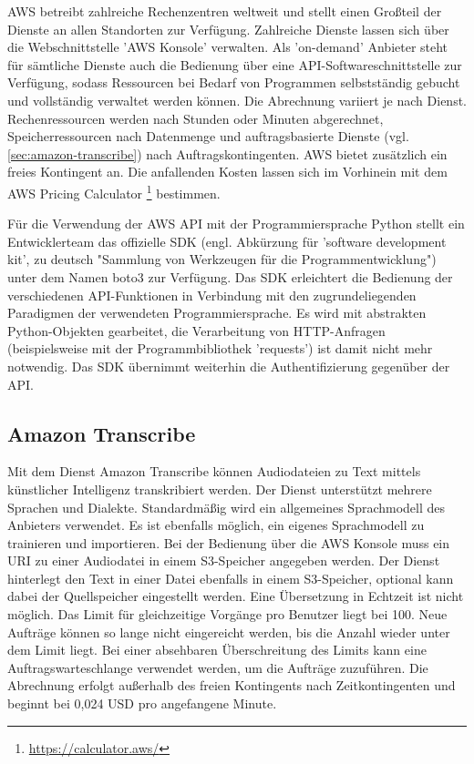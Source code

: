 AWS betreibt zahlreiche Rechenzentren weltweit und stellt einen Großteil der Dienste an allen Standorten zur Verfügung. Zahlreiche Dienste lassen sich über die Webschnittstelle 'AWS Konsole' verwalten. Als 'on-demand' Anbieter steht für sämtliche Dienste auch die Bedienung über eine API-Softwareschnittstelle zur Verfügung, sodass Ressourcen bei Bedarf von Programmen selbstständig gebucht und vollständig verwaltet werden können. Die Abrechnung variiert je nach Dienst. Rechenressourcen werden nach Stunden oder Minuten abgerechnet, Speicherressourcen nach Datenmenge und auftragsbasierte Dienste (vgl. \autoref{sec:amazon-transcribe}) nach Auftragskontingenten. AWS bietet zusätzlich ein freies Kontingent an. Die anfallenden Kosten lassen sich im Vorhinein mit dem AWS Pricing Calculator \footnote{\url{https://calculator.aws/}} bestimmen. 

Für die Verwendung der AWS API mit der Programmiersprache Python stellt ein Entwicklerteam das offizielle SDK (engl. Abkürzung für 'software development kit', zu deutsch "Sammlung von Werkzeugen für die Programmentwicklung") unter dem Namen boto3 zur Verfügung. Das SDK erleichtert die Bedienung der verschiedenen API-Funktionen in Verbindung mit den zugrundeliegenden Paradigmen der verwendeten Programmiersprache. Es wird mit abstrakten Python-Objekten gearbeitet, die Verarbeitung von HTTP-Anfragen (beispielsweise mit der Programmbibliothek 'requests') ist damit nicht mehr notwendig. Das SDK übernimmt weiterhin die Authentifizierung gegenüber der API.

\subsection{Amazon Transcribe}
\label{sec:amazon-transcribe}

Mit dem Dienst Amazon Transcribe können Audiodateien zu Text mittels künstlicher Intelligenz transkribiert werden. Der Dienst unterstützt mehrere Sprachen und Dialekte. Standardmäßig wird ein allgemeines Sprachmodell des Anbieters verwendet. Es ist ebenfalls möglich, ein eigenes Sprachmodell zu trainieren und importieren. Bei der Bedienung über die AWS Konsole muss ein URI zu einer Audiodatei in einem S3-Speicher angegeben werden. Der Dienst hinterlegt den Text in einer Datei ebenfalls in einem S3-Speicher, optional kann dabei der Quellspeicher eingestellt werden. Eine Übersetzung in Echtzeit ist nicht möglich. Das Limit für gleichzeitige Vorgänge pro Benutzer liegt bei 100. Neue Aufträge können so lange nicht eingereicht werden, bis die Anzahl wieder unter dem Limit liegt. Bei einer absehbaren Überschreitung des Limits kann eine Auftragswarteschlange verwendet werden, um die Aufträge zuzuführen. Die Abrechnung erfolgt außerhalb des freien Kontingents nach Zeitkontingenten und beginnt bei 0,024 USD pro angefangene Minute.

